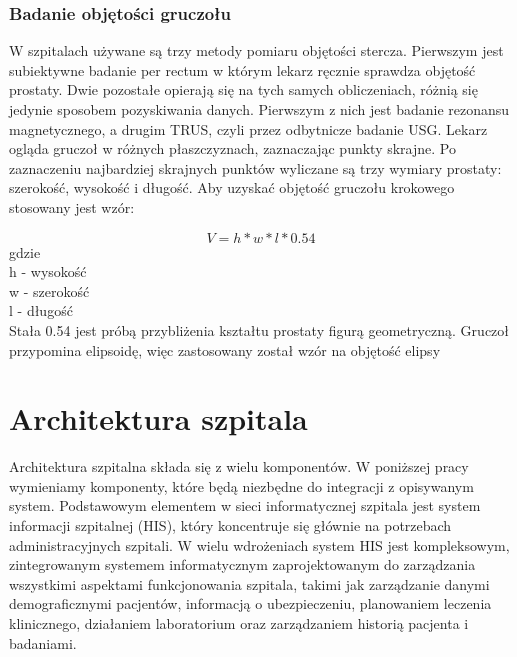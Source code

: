 \documentclass[a4paper,11pt,twoside]{report}
\theoremstyle{definition}
\begin{document}
\subsubsection{Badanie objętości gruczołu}
W szpitalach używane są trzy metody pomiaru objętości stercza. Pierwszym jest subiektywne badanie per rectum w którym lekarz ręcznie sprawdza objętość prostaty. Dwie pozostałe opierają się na tych samych obliczeniach, różnią się jedynie sposobem pozyskiwania danych. Pierwszym z nich jest badanie rezonansu magnetycznego, a drugim TRUS, czyli przez odbytnicze badanie USG. Lekarz ogląda gruczoł w różnych płaszczyznach, zaznaczając punkty skrajne. Po zaznaczeniu najbardziej skrajnych punktów wyliczane są trzy wymiary prostaty: szerokość, wysokość i długość. Aby uzyskać objętość gruczołu krokowego stosowany jest wzór:

\[V = h*w* l * 0.54\]
gdzie \\
h - wysokość \\
w - szerokość \\
l - długość \\
Stała 0.54 jest próbą przybliżenia kształtu prostaty figurą geometryczną. Gruczoł przypomina elipsoidę, więc zastosowany został wzór na objętość elipsy

\section{Architektura szpitala}

Architektura szpitalna składa się z wielu komponentów. W poniższej pracy wymieniamy  komponenty, które będą niezbędne do integracji z opisywanym system. Podstawowym elementem w sieci informatycznej  szpitala jest system informacji szpitalnej (HIS), który koncentruje się głównie na potrzebach administracyjnych szpitali. W wielu wdrożeniach system HIS jest kompleksowym, zintegrowanym systemem informatycznym zaprojektowanym do zarządzania wszystkimi aspektami funkcjonowania szpitala, takimi jak zarządzanie danymi demograficznymi pacjentów, informacją o ubezpieczeniu, planowaniem leczenia klinicznego, działaniem laboratorium oraz zarządzaniem historią pacjenta i badaniami.
\end{document}
